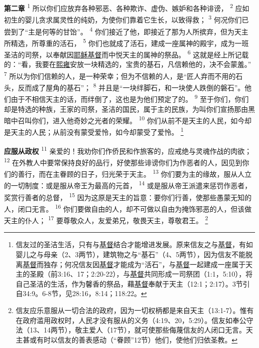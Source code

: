 \textbf{第二章\quad}
\textsuperscript{1}
所以你们应放弃各种邪恶、各种欺诈、虚伪、嫉妒和各种诽谤，
\textsuperscript{2}
应如初生的婴儿贪求属灵性的纯奶，为使你们靠着它生长，以致得救；
\textsuperscript{3}
何况你们已尝到了“主是何等的甘饴”。
\textsuperscript{4}
你们接近了他，即接近了那为人所摈弃，但为天主所精选，所尊重的活石，
\textsuperscript{5}
你们也就成了活石，建成一座属神的殿宇，成为一班圣洁的司祭，以奉献因\uline{耶稣}\uline{基督}而中悦天主的属神的祭品。
\textsuperscript{6}
这就是经上所记载的：“看，我要在\uline{熙雍}安放一块精选的，宝贵的基石，凡信赖他的，决不会蒙羞。”
\textsuperscript{7}
所以为你们信赖的人，是一种荣幸；但为不信赖的人，是“匠人弃而不用的石头，反而成了屋角的基石”；
\textsuperscript{8}
并且是“一块绊脚石，和一块使人跌倒的磐石”。他们由于不相信天主的话，而绊倒了，这也是为他们预定了的。
\textsuperscript{9}
至于你们，你们却是特选的种族，王家的司祭，圣洁的国民，属于主的民族，为叫你们宣扬那由黑暗中召叫你们，进入他奇妙之光者的荣耀。
\textsuperscript{10}
你们从前不是天主的人民，如今却是天主的人民；从前没有蒙受爱怜，如今却蒙受了爱怜。
\footnote{信友过的圣洁生活，只有与\uline{基督}结合才能增进发展。原来信友之与\uline{基督}，有如婴儿之与母亲（2、3两节），建筑物之与“基石”（4、5两节），因为信友不能脱离\uline{基督}而独存；何况信友因\uline{基督}才能成为“活石”，与\uline{基督}一起建成一座属于天主的圣殿（前3:16、17；2:20-22），与\uline{基督}共同形成一司祭团（1:1，5:10），将自己圣洁的生活，作为馨香的祭品，藉\uline{基督}奉献于天主（12:1；2:17）。3节引自34:9。6-8节，见28:16，8:14；118:22。}

\textbf{应服从政权\quad}
\textsuperscript{11}
亲爱的！我劝你们作侨民和作旅客的，应戒绝与灵魂作战的肉欲；
\textsuperscript{12}
在外教人中要常保持良好的品行，好使那些诽谤你们为作恶者的人，因见到你们的善行，而在主眷顾的日子，归光荣于天主。
\textsuperscript{13}
你们要为主的缘故，服从人立的一切制度：或是服从帝王为最高的元首，
\textsuperscript{14}
或是服从帝王派遣来惩罚作恶者，奖赏行善者的总督，
\textsuperscript{15}
因为这原是天主的旨意：要你们行善，使那些愚蒙无知的人，闭口无言。
\textsuperscript{16}
你们要做自由的人，却不可做以自由为掩饰邪恶的人，但该做天主的仆人；
\textsuperscript{17}
要尊敬众人，友爱弟兄，敬畏天主，尊敬君王。
\footnote{信友应乐意服从一切合法的政府，因为一切权柄都是来自天主（13:1-7）。惟有在政府滥用政权时，人民才没有服从的义务（4:19、20，5:29）。信友如奉公守法（13、14两节），敬主爱人（17节），就可使那些侮蔑信友的人闭口无言。天主甚或有时以信友的善表感动（“眷顾”12节）他们，使他们归依圣教。}

